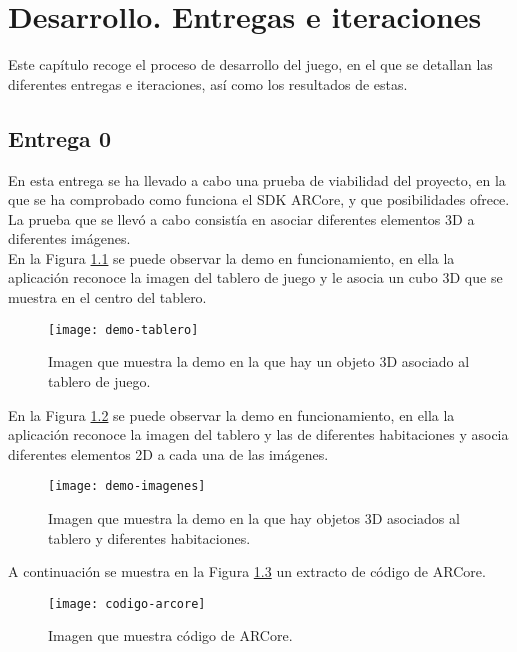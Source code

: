 \chapter{Desarrollo. Entregas e iteraciones}
\label{ch:desarrollo}
Este capítulo recoge el proceso de desarrollo del juego, en el que se detallan las diferentes entregas e iteraciones, así como los resultados de estas.

\section{Entrega 0}
En esta entrega se ha llevado a cabo una prueba de viabilidad del proyecto, en la que se ha comprobado como funciona el SDK ARCore, y que posibilidades ofrece. La prueba que se llevó a cabo consistía en asociar diferentes elementos 3D a diferentes imágenes.\\

En la Figura \ref{figura-demo-tablero} se puede observar la demo en funcionamiento, en ella la aplicación reconoce la imagen del tablero de juego y le asocia un cubo 3D que se muestra en el centro del tablero.

\begin{figure}[h]
  \centering
  \texttt{[image: demo-tablero]}
  \caption{Imagen que muestra la demo en la que hay un objeto 3D asociado al tablero de juego.}
  \label{figura-demo-tablero}
\end{figure}

\newpage
En la Figura \ref{figura-demo-imagenes} se puede observar la demo en funcionamiento, en ella la aplicación reconoce la imagen del tablero y las de diferentes habitaciones y asocia diferentes elementos 2D a cada una de las imágenes.

\begin{figure}[h]
  \centering
  \texttt{[image: demo-imagenes]}
  \caption{Imagen que muestra la demo en la que hay objetos 3D asociados al tablero y diferentes habitaciones.}
  \label{figura-demo-imagenes}
\end{figure}

A continuación se muestra en la Figura \ref{figura-codigo} un extracto de código de ARCore.

\begin{figure}[h]
  \centering
  \texttt{[image: codigo-arcore]}
  \caption{Imagen que muestra código de ARCore.}
  \label{figura-codigo}
\end{figure}

\FloatBarrier

